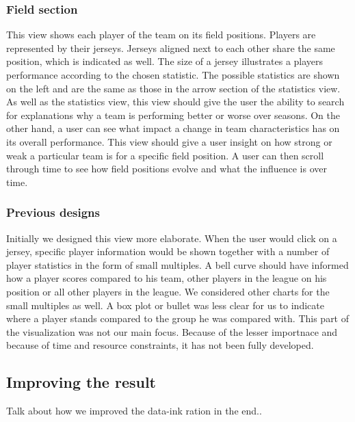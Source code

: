 \documentclass[chi_draft]{sigchi}
\begin{document}
\subsubsection{Field section}
This view shows each player of the team on its field positions. Players are
represented by their jerseys. Jerseys aligned next to each other share the same
position, which is indicated as well. The size of a jersey illustrates a
players performance according to the chosen statistic. The possible statistics 
are shown on the left and are the same as those in the arrow section of the 
statistics view. As well as the statistics view, this view should give the user 
the ability to search for explanations why a team is performing better or worse 
over seasons. On the other hand, a user can see what impact a change in team 
characteristics has on its overall performance. This view should give a user 
insight on how strong or weak a particular team is for a specific field position. 
A user can then scroll through time to see how field positions evolve and what 
the influence is over time.

\subsubsection{Previous designs}
Initially we designed this view more elaborate. When the user would click on a
jersey, specific player information would be shown together with a number of player
statistics in the form of small multiples. A bell curve should have informed
how a player scores compared to his team, other players in the league on his
position or all other players in the league. We considered other charts for the
small multiples as well. A box plot or bullet was less clear for us to indicate
where a player stands compared to the group he was compared with. This part of the 
visualization was not our main focus. Because of the lesser importnace and because of time and resource constraints, it has not been fully developed. 

\subsection{Improving the result}
Talk about how we improved the data-ink ration in the end..
\end{document}
